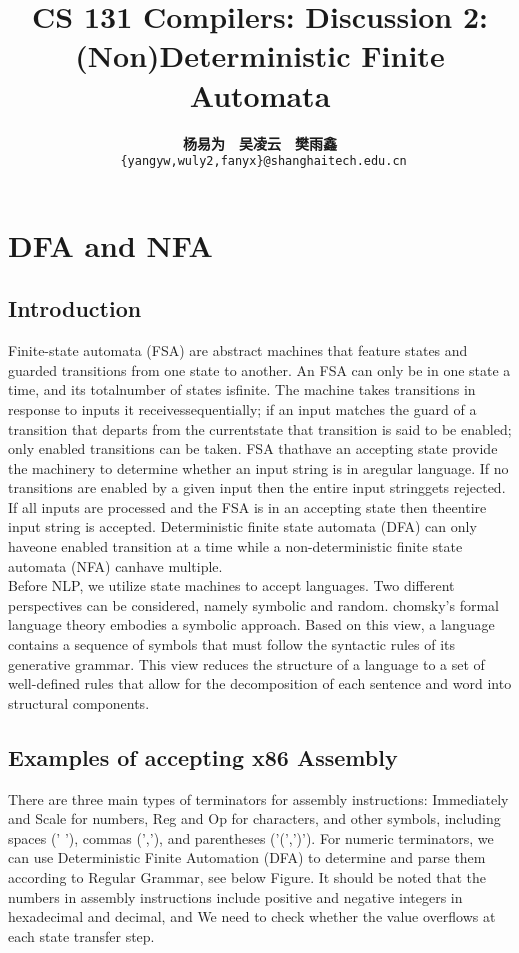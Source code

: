 \documentclass[a4paper]{exam}
\title{CS 131 Compilers: Discussion 2: (Non)Deterministic Finite Automata}
\author{\textbf{杨易为}~~\textbf{吴凌云}~~\textbf{樊雨鑫} \\ \texttt{ \{yangyw,wuly2,fanyx\}@shanghaitech.edu.cn}}
\begin{document}
\maketitle
\section{DFA and NFA}
\subsection{Introduction}

Finite-state automata (FSA) are abstract machines that feature states and guarded transitions from one state to another. An FSA can only be in one state a time, and its totalnumber of states isfinite.  The machine takes transitions in response to inputs it receivessequentially;  if an input matches the guard of a transition that departs from the currentstate that transition is said to be enabled; only enabled transitions can be taken.  FSA thathave an accepting state provide the machinery to determine whether an input string is in aregular language.  If no transitions are enabled by a given input then the entire input stringgets  rejected.   If  all  inputs  are  processed  and  the  FSA  is  in  an  accepting  state  then  theentire input string is accepted.  Deterministic finite state automata (DFA) can only haveone enabled transition at a time while a non-deterministic finite state automata (NFA) canhave multiple.
\\
Before NLP, we utilize state machines to accept languages. Two different perspectives can be considered, namely symbolic and random. chomsky's formal language theory embodies a symbolic approach. Based on this view, a language contains a sequence of symbols that must follow the syntactic rules of its generative grammar. This view reduces the structure of a language to a set of well-defined rules that allow for the decomposition of each sentence and word into structural components.
\subsection{Examples of accepting x86 Assembly\cite{bcst}}
There are three main types of terminators for assembly instructions: Immediately and Scale for numbers, Reg and Op for characters, and other symbols, including spaces (' '), commas (','), and parentheses ('(',')'). For numeric terminators, we can use Deterministic Finite Automation (DFA) to determine and parse them according to Regular Grammar, see below Figure. It should be noted that the numbers in assembly instructions include positive and negative integers in hexadecimal and decimal, and We need to check whether the value overflows at each state transfer step.
\end{document}
